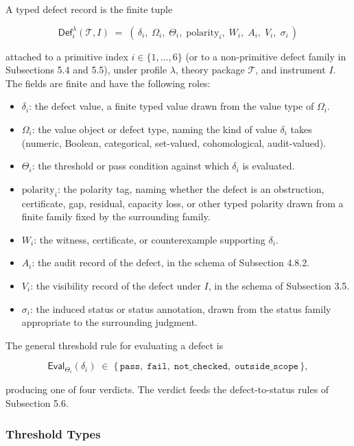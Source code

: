 \documentclass[11pt]{article}
\providecommand{\tightlist}{}
\theoremstyle{definition}
\begin{document}
A typed defect record is the finite tuple

\[
\mathsf{Def}_i^{\lambda}(\mathcal T,I)\;=\;(\,\delta_i,\;\Omega_i,\;\Theta_i,\;\mathrm{polarity}_i,\;W_i,\;A_i,\;V_i,\;\sigma_i\,)
\]

attached to a primitive index \(i\in\{1,\ldots,6\}\) (or to a non-primitive defect family in Subsections 5.4 and 5.5), under profile \(\lambda\), theory package \(\mathcal T\), and instrument \(I\). The fields are finite and have the following roles:

\begin{itemize}
\tightlist
\item
  \(\delta_i\): the defect value, a finite typed value drawn from the value type of \(\Omega_i\).
\item
  \(\Omega_i\): the value object or defect type, naming the kind of value \(\delta_i\) takes (numeric, Boolean, categorical, set-valued, cohomological, audit-valued).
\item
  \(\Theta_i\): the threshold or pass condition against which \(\delta_i\) is evaluated.
\item
  \(\mathrm{polarity}_i\): the polarity tag, naming whether the defect is an obstruction, certificate, gap, residual, capacity loss, or other typed polarity drawn from a finite family fixed by the surrounding family.
\item
  \(W_i\): the witness, certificate, or counterexample supporting \(\delta_i\).
\item
  \(A_i\): the audit record of the defect, in the schema of Subsection 4.8.2.
\item
  \(V_i\): the visibility record of the defect under \(I\), in the schema of Subsection 3.5.
\item
  \(\sigma_i\): the induced status or status annotation, drawn from the status family appropriate to the surrounding judgment.
\end{itemize}

The general threshold rule for evaluating a defect is

\[
\mathsf{Eval}_{\Theta_i}(\delta_i)\;\in\;\{\,\texttt{pass},\;\texttt{fail},\;\texttt{not\_checked},\;\texttt{outside\_scope}\,\},
\]

producing one of four verdicts. The verdict feeds the defect-to-status rules of Subsection 5.6.

\subsubsection{Threshold Types}
\end{document}
